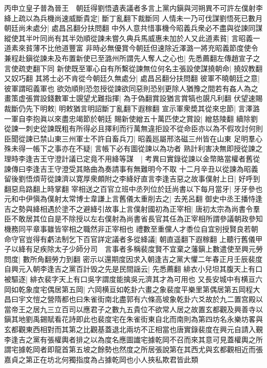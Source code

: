 丙申立皇子普為晉王　朝廷得劉悟遺表議者多言上黨内鎭與河朔異不可許左僕射李絳上疏以為兵機尚速威斷貴定|{
	斷丁亂翻下裁斷同}
人情未一乃可伐謀劉悟死已數月朝廷尚未處分|{
	處昌呂翻分扶問翻}
中外人意共惜事機今昭義兵衆必不盡與從諫同謀縱使其半叶同尚有其半効順從諫未嘗久典兵馬威惠未加於人又此道素貧|{
	言昭義一道素來貧薄不比他道豐富}
非時必無優賞今朝廷但速除近澤潞一將充昭義節度使令兼程赴鎭從諫未及布置新使已至潞州所謂先人奪人之心也|{
	先悉薦翻左傳趙宣子之言使疏吏翻下同}
新使既至軍心自有所繫從諫無位何名主張設使謀撓朝命|{
	撓奴教翻又奴巧翻}
其將士必不肯從今朝廷久無處分|{
	處昌呂翻分扶問翻}
彼軍不曉朝廷之意|{
	彼軍謂昭義軍也}
欲効順則恐忽授從諫欲同惡則恐别更除人猶豫之間若有姦人為之畫策虚張賞設錢數軍士覬望尤難指揮|{
	為于偽翻賞設猶言賞犒也覬凡利翻}
伏望速賜裁斷仍先下明敕|{
	明敕猶言明詔斷丁亂翻下遐稼翻}
宣示軍衆奬其從來忠節|{
	言澤潞一軍自李抱眞以來盡忠竭節於朝廷}
賜新使繒五十萬匹使之賞設|{
	繒慈陵翻}
續除劉從諫一刺史從諫既粗有所得必且擇利而行萬無違拒設不從命臣亦以為不假攻討何則臣聞從諫已禁山東三州軍士不許自畜兵刀|{
	昭義廵屬邢洛磁三州皆在山東}
足明羣心殊未得一帳下之事亦在不疑|{
	言帳下必有圖從諫以為功者}
熟計利害决無即授從諫之理時李逢吉王守澄計議已定竟不用絳等謀　|{
	考異曰實錄從諫以金幣賂當權者舊從諫傳曰李逢吉王守澄受其賂曲為奏請事有無難明今不取}
十二月辛丑以從諫為昭義留後劉悟煩苛從諫濟以寛厚衆頗附之李絳好直言李逢吉惡之故事僕射上日|{
	好呼到翻惡烏路翻上時掌翻}
宰相送之百官立班中丞列位於廷尚書以下每月當牙|{
	牙牙參也}
元和中伊愼為僕射太常博士韋謙上言舊儀太重削去之|{
	去羌呂翻}
御史中丞王播恃逢吉之勢與絳相遇於塗不之避絳引故事上言僕射國初為正宰相|{
	唐初太宗為尚書令羣臣不敢居其位自是不除授以左右僕射為尚書省長官其任為正宰相所謂參議朝政參知機務同平章事雖皆宰相之職然非正宰相也}
禮數至重儻人才黍位自宜别授賢良若朝命守官豈得有虧法制乞下百官詳定議者多從絳議|{
	朝直遥翻下遐稼翻}
上聽行舊儀甲子以絳有足疾除太子少師分司　言事者多稱裴度賢不宜棄之藩鎭上數遣使至興元勞問度|{
	數所角翻勞力到翻}
密示以還期度因求入朝逢吉之黨大懼二年春正月壬辰裴度自興元入朝李逢吉之黨百計毁之先是民間謡云|{
	先悉薦翻}
緋衣小兒坦其腹天上有口被驅逐|{
	緋衣裴字天上有口吳字謂度能擒吳元濟其才為可用也}
又長安城中有横亘六岡如乾象度宅偶居第五岡|{
	六岡横亘如乾卦六畫之象裴度平樂里第偶居第五岡程大昌曰宇文愷之營隋都也曰朱雀街南北盡郭有六條高坡象乾卦六爻故於九二置宫殿以當帝王之居九三立百司以應君子之數九五貴位不欲常人居之故置玄都觀及興善寺以鎭其地劉禹錫賦看花詩即此也裴度宅在朱雀街東自北而南則為第四坊名永樂坊畧與玄都觀東西相對而其第之比觀基蓋退北兩坊不正相當也唐實錄裴度在興元自請入覲李逢吉之黨有張權輿者排之以為度名應圖䜟宅據乾岡不召而來其意可見蓋權輿之所謂宅據乾岡者即龍首第五坡之餘勢也然度之所居張說第在其西尤與玄都觀相近而張嘉貞之第正在坊北何獨指度為占據乾岡也小人挾私欺君皆此類}
